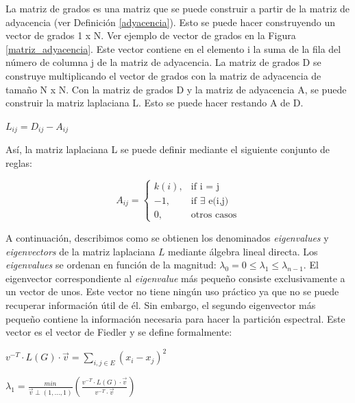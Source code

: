 \begin{mydef}\label{laplaciana}
	La matriz de grados es una matriz que se puede construir a partir de la matriz de adyacencia (ver Definición \ref{adyacencia}). Esto se puede hacer construyendo un vector de grados 1 x N. Ver ejemplo de vector de grados en la Figura \ref{matriz_adyacencia}. Este vector contiene en el elemento i la suma de la fila del número de columna j de la matriz de adyacencia. La matriz de grados D se construye multiplicando el vector de grados con la matriz de adyacencia de tamaño N x N. Con la matriz de grados D y la matriz de adyacencia A, se puede construir la matriz laplaciana L. Esto se puede hacer restando A de D. 
	\begin{center}
		$L_{ij} = D_{ij} - A_{ij}$
	\end{center}
	Así, la matriz laplaciana L se puede definir mediante el siguiente conjunto de reglas:
	\begin{center}
		$$
		A_{ij} = 
		\begin{cases}
		k(i), & \text{if i = j} \\
		-1, & \text{if $\exists$ e(i,j)} \\
		0, & \text{otros casos}
		\end{cases}
		$$
	\end{center}
\end{mydef}

A continuación, describimos como se obtienen los denominados \textit{eigenvalues} y \textit{eigenvectors} de la matriz laplaciana $L$  mediante álgebra lineal directa. Los \textit{eigenvalues} se ordenan en función de la magnitud: $\lambda_{0} = 0 \leq \lambda_{1} \leq \lambda_{n-1}$. El eigenvector correspondiente al \textit{eigenvalue} más pequeño consiste exclusivamente a un vector de unos. Este vector no tiene ningún uso práctico ya que no se puede recuperar información útil de él. Sin embargo, el segundo eigenvector más pequeño contiene la información necesaria para hacer la partición espectral. Este vector es el vector de Fiedler y se define formalmente:

\begin{center}
	$v^{-T} \cdot L(G) \cdot \vec{v} = \sum_{i,j \in E}^{} (x_{i} - x_{j})^2$
\end{center}

\begin{center}
	$\lambda_{1} = \frac{min}{\vec{v} \perp (1, ..., 1)} \left(\frac{v^{-T} \cdot L(G) \cdot \vec{v}}{v^{-T} \cdot \vec{v}} \right)$
\end{center}

